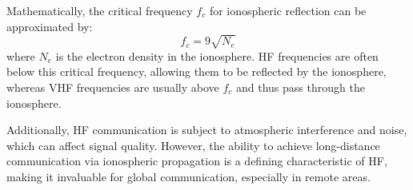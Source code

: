 Mathematically, the critical frequency \( f_c \) for ionospheric reflection can be approximated by:
\[
f_c = 9 \sqrt{N_e}
\]
where \( N_e \) is the electron density in the ionosphere. HF frequencies are often below this critical frequency, allowing them to be reflected by the ionosphere, whereas VHF frequencies are usually above \( f_c \) and thus pass through the ionosphere.

Additionally, HF communication is subject to atmospheric interference and noise, which can affect signal quality. However, the ability to achieve long-distance communication via ionospheric propagation is a defining characteristic of HF, making it invaluable for global communication, especially in remote areas.

